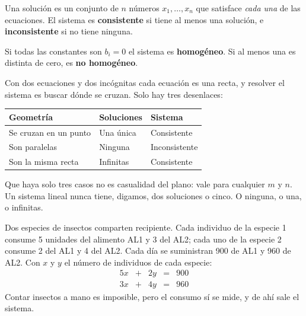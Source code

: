 \documentclass[11pt,letterpaper]{article}
\begin{document}
\begin{definicion}
  Una solución es un conjunto de $n$ números
  $x_1, \ldots, x_n$ que satisface \emph{cada una} de las ecuaciones.
  El sistema es \textbf{consistente} si tiene al menos una solución, e
  \textbf{inconsistente} si no tiene ninguna.
\end{definicion}

\begin{definicion}[Homogéneo]
  Si todas las constantes son $b_i = 0$ el sistema es
  \textbf{homogéneo}. Si al menos una es distinta de cero, es
  \textbf{no homogéneo}.
\end{definicion}

Con dos ecuaciones y dos incógnitas cada ecuación es una recta, y
resolver el sistema es buscar dónde se cruzan. Solo hay tres
desenlaces:

\begin{center}
\begin{tabular}{lll}
    \toprule
    \textbf{Geometría} & \textbf{Soluciones} & \textbf{Sistema} \\
    \midrule
    Se cruzan en un punto & Una única       & Consistente \\
    Son paralelas         & Ninguna         & Inconsistente \\
    Son la misma recta    & Infinitas       & Consistente \\
    \bottomrule
\end{tabular}
\end{center}

\begin{idea}
  Que haya solo tres casos no es casualidad del plano: vale para
  cualquier $m$ y $n$. Un sistema lineal nunca tiene, digamos, dos
  soluciones o cinco. O ninguna, o una, o infinitas.
\end{idea}

\begin{ejemplo}
  Dos especies de insectos comparten recipiente. Cada individuo de la
  especie 1 consume 5 unidades del alimento AL1 y 3 del AL2; cada uno
  de la especie 2 consume 2 del AL1 y 4 del AL2. Cada día se
  suministran 900 de AL1 y 960 de AL2. Con $x$ y $y$ el número de
  individuos de cada especie:
  \[
      \begin{array}{rcrcl}
        5x & + & 2y & = & 900 \\
        3x & + & 4y & = & 960
      \end{array}
  \]
  Contar insectos a mano es imposible, pero el consumo sí se mide, y
  de ahí sale el sistema.
\end{ejemplo}
\end{document}
